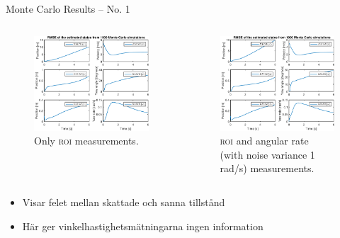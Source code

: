 \documentclass{beamer}
\newcommand{\roi}{\textsc{roi}\xspace}
\renewcommand{\a}{\r{a}\xspace}
\renewcommand{\aa}{\"a\xspace}
\begin{document}
\begin{frame}{Monte Carlo Results -- No. 1}
	\begin{columns}[T]
	\begin{figure}
		\includegraphics[width=\textwidth]{MC/27_MC_1000_Rmse}
		\caption{Only \roi measurements.}
	\end{figure}
	\begin{figure}
		\includegraphics[width=\textwidth]{MC/22_MC_1000_Rmse}
		\caption{\roi and angular rate (with noise variance 1 rad/s) measurements.}
	\end{figure}
	\end{columns}

	\note
	{
		\begin{itemize}
			\item Visar felet mellan skattade och sanna tillst\a{}nd
			\item H\aa{}r ger vinkelhastighetsm\aa{}tningarna ingen information
		\end{itemize}
	}
\end{frame}
\end{document}
